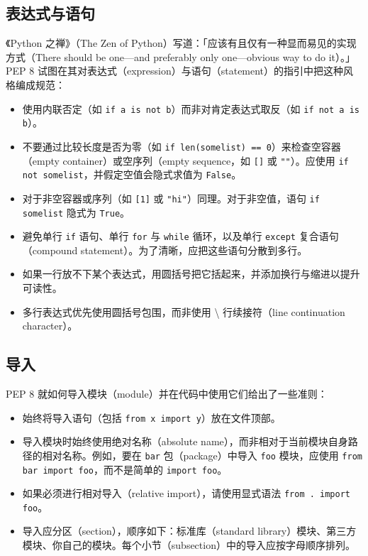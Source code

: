 \subsection{表达式与语句}

《Python 之禅》（The Zen of Python）写道：「应该有且仅有一种显而易见的实现方式（There should be one—and preferably only one—obvious way to do it）。」PEP 8 试图在其对表达式（expression）与语句（statement）的指引中把这种风格编成规范：

\begin{itemize}
\item 使用内联否定（如 \texttt{if a is not b}）而非对肯定表达式取反（如 \texttt{if not a is b}）。
\item 不要通过比较长度是否为零（如 \texttt{if len(somelist) == 0}）来检查空容器（empty container）或空序列（empty sequence，如 \texttt{[]} 或 \texttt{""}）。应使用 \texttt{if not somelist}，并假定空值会隐式求值为 \texttt{False}。
\item 对于非空容器或序列（如 \texttt{[1]} 或 \texttt{"hi"}）同理。对于非空值，语句 \texttt{if somelist} 隐式为 \texttt{True}。
\item 避免单行 \texttt{if} 语句、单行 \texttt{for} 与 \texttt{while} 循环，以及单行 \texttt{except} 复合语句（compound statement）。为了清晰，应把这些语句分散到多行。
\item 如果一行放不下某个表达式，用圆括号把它括起来，并添加换行与缩进以提升可读性。
\item 多行表达式优先使用圆括号包围，而非使用 \textbackslash{} 行续接符（line continuation character）。
\end{itemize}

\subsection{导入}

PEP 8 就如何导入模块（module）并在代码中使用它们给出了一些准则：

\begin{itemize}
\item 始终将导入语句（包括 \texttt{from x import y}）放在文件顶部。
\item 导入模块时始终使用绝对名称（absolute name），而非相对于当前模块自身路径的相对名称。例如，要在 \texttt{bar} 包（package）中导入 \texttt{foo} 模块，应使用 \texttt{from bar import foo}，而不是简单的 \texttt{import foo}。
\item 如果必须进行相对导入（relative import），请使用显式语法 \texttt{from . import foo}。
\item 导入应分区（section），顺序如下：标准库（standard library）模块、第三方模块、你自己的模块。每个小节（subsection）中的导入应按字母顺序排列。
\end{itemize}

